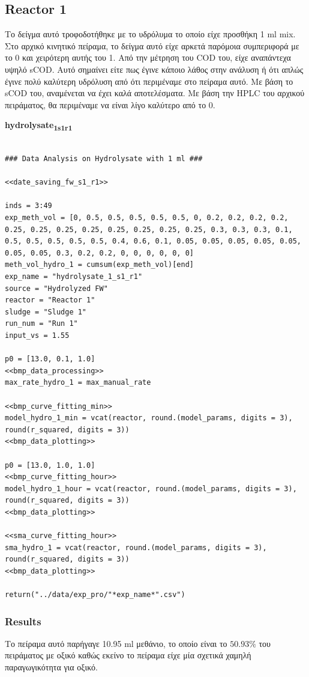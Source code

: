 \documentclass[11pt]{article}
\begin{document}
\subsection{Reactor 1}
\label{sec:org1cd0683}
Το δείγμα αυτό τροφοδοτήθηκε με το υδρόλυμα το οποίο είχε προσθήκη 1 ml mix. Στο αρχικό κινητικό πείραμα, το δείγμα αυτό είχε αρκετά παρόμοια συμπεριφορά με το 0 και χειρότερη αυτής του 1. Από την μέτρηση του COD του, είχε αναπάντεχα υψηλό sCOD. Αυτό σημαίνει είτε πως έγινε κάποιο λάθος στην ανάλυση ή ότι απλώς έγινε πολύ καλύτερη υδρόλυση από ότι περιμέναμε στο πείραμα αυτό. Με βάση το sCOD του, αναμένεται να έχει καλά αποτελέσματα. Με βάση την HPLC του αρχικού πειράματος, θα περιμέναμε να είναι λίγο καλύτερο από το 0.

\textbf{hydrolysate\textsubscript{1}\textsubscript{s1}\textsubscript{r1}}
\begin{verbatim}

### Data Analysis on Hydrolysate with 1 ml ###

<<date_saving_fw_s1_r1>>

inds = 3:49
exp_meth_vol = [0, 0.5, 0.5, 0.5, 0.5, 0.5, 0, 0.2, 0.2, 0.2, 0.2, 0.25, 0.25, 0.25, 0.25, 0.25, 0.25, 0.25, 0.25, 0.3, 0.3, 0.3, 0.1, 0.5, 0.5, 0.5, 0.5, 0.5, 0.4, 0.6, 0.1, 0.05, 0.05, 0.05, 0.05, 0.05, 0.05, 0.05, 0.3, 0.2, 0.2, 0, 0, 0, 0, 0, 0]
meth_vol_hydro_1 = cumsum(exp_meth_vol)[end]
exp_name = "hydrolysate_1_s1_r1"
source = "Hydrolyzed FW"
reactor = "Reactor 1"
sludge = "Sludge 1"
run_num = "Run 1"
input_vs = 1.55

p0 = [13.0, 0.1, 1.0]
<<bmp_data_processing>>
max_rate_hydro_1 = max_manual_rate

<<bmp_curve_fitting_min>>
model_hydro_1_min = vcat(reactor, round.(model_params, digits = 3), round(r_squared, digits = 3))
<<bmp_data_plotting>>

p0 = [13.0, 1.0, 1.0]
<<bmp_curve_fitting_hour>>
model_hydro_1_hour = vcat(reactor, round.(model_params, digits = 3), round(r_squared, digits = 3))
<<bmp_data_plotting>>

<<sma_curve_fitting_hour>>
sma_hydro_1 = vcat(reactor, round.(model_params, digits = 3), round(r_squared, digits = 3))
<<bmp_data_plotting>>

return("../data/exp_pro/"*exp_name*".csv")
\end{verbatim}

\subsubsection{Results}
\label{sec:orgbb224a9}
Το πείραμα αυτό παρήγαγε 10.95 ml μεθάνιο, το οποίο είναι το \(50.93 \%\) του πειράματος με οξικό καθώς εκείνο το πείραμα είχε μία σχετικά χαμηλή παραγωγικότητα για οξικό.
\end{document}
